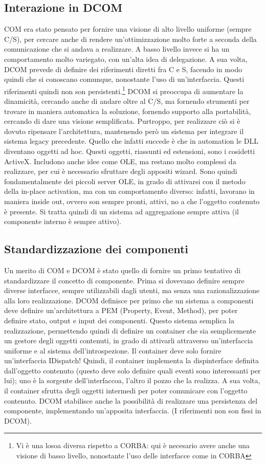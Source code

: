 \subsection{Interazione in DCOM}
COM era stato pensato per fornire una visione di alto livello uniforme (sempre C/S), per cercare anche di rendere
un'ottimizzazione molto forte a seconda della comunicazione che si andava a realizzare. A basso livello invece si ha un
comportamento molto variegato, con un'alta idea di delegazione.
A sua volta, DCOM prevede di definire dei riferimenti diretti fra C e S, facendo in modo quindi che si conoscano
comunque, nonostante l'uso di un'interfaccia. Questi riferimenti quindi non son persistenti.\footnote{Vi è una losoa
diversa rispetto a CORBA: qui è necesario avere anche una visione di basso livello, nonostante l'uso delle interfacce
come in CORBA} DCOM si preoccupa di aumentare la dinamicità, cercando anche di andare oltre al C/S, ma fornendo
strumenti per trovare in maniera automatica la soluzione, fornendo supporto alla portabilità, cercando di dare una
visione semplificata. Purtroppo, per realizzare ciò si è dovuto ripensare l'architettura, mantenendo però un sistema per
integrare il sistema legacy precedente.
Quello che infatti succede è che in automation le DLL diventano oggetti ad hoc. Questi oggetti, riassunti ed
estensioni, sono i cosidetti ActiveX. Includono anche idee come OLE, ma restano molto complessi da realizzare, per cui è
necessario sfruttare degli appositi wizard. Sono quindi fondamentalmente dei piccoli server OLE, in grado di attivarsi
con il metodo della in-place activation, ma con un comportamento diverso: infatti, lavorano in maniera inside out,
ovvero son sempre pronti, attivi, no a che l'oggetto contenuto è presente. Si tratta quindi di un sistema ad
aggregazione sempre attiva (il componente interno è sempre attivo).
\subsection{Standardizzazione dei componenti}
Un merito di COM e DCOM è stato quello di fornire un primo tentativo di standardizzare il concetto di componente. Prima
si dovevano definire sempre diverse interfacce, sempre utilizzabili dagli utenti, ma senza una razionalizzazione alla
loro realizzazione.
DCOM definisce per primo che un sistema a componenti deve definire un'architettura a PEM (Property, Event, Method), per
poter definire stato, output e input dei componenti. Questo sistema semplica la realizzazione, permettendo quindi di
definire un container che sia semplicemente un gestore degli oggetti contenuti, in grado di attivarli attraverso
un'interfaccia uniforme e al sistema dell'introspezione. Il container deve solo fornire un'interfaccia IDispatch!
Quindi, il container implementa la dispinterface definita dall'oggetto contenuto (questo deve solo definire quali eventi
sono interessanti per lui); uno è la sorgente dell'interfaccoa, l'altro il pozzo che la realizza. A sua volta, il
container sfrutta degli oggetti intermedi per poter comunicare con l'oggetto contenuto.
DCOM stabilisce anche la possibilità di realizzare una persistenza del componente, implementando un'apposita
interfaccia. (I riferimenti non son fissi in DCOM).
